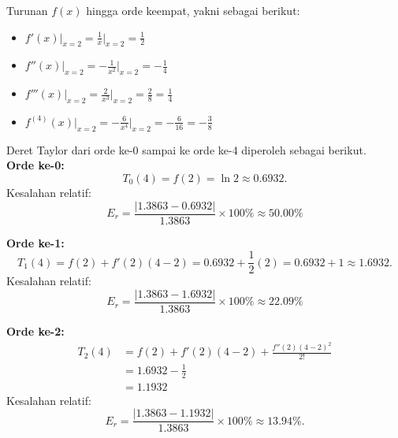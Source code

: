 \documentclass{article}
\begin{document}
\begin{enumerate}
    Turunan $f(x)$ hingga orde keempat, yakni sebagai berikut:
    \begin{itemize}
        \item $f'(x)\big|_{x=2} = \frac{1}{x} \big|_{x=2} = \frac{1}{2}$
        \item $f''(x)\big|_{x=2} = -\frac{1}{x^2} \big|_{x=2} = -\frac{1}{4}$
        \item $f'''(x)\big|_{x=2} = \frac{2}{x^3} \big|_{x=2} = \frac{2}{8} = \frac{1}{4}$
        \item $f^{(4)}(x)\big|_{x=2} = -\frac{6}{x^4} \big|_{x=2} = -\frac{6}{16} = -\frac{3}{8}$
    \end{itemize}
    
    Deret Taylor dari orde ke-0 sampai ke orde ke-4 diperoleh sebagai berikut. \\
    
    \textbf{Orde ke-0:} 
    \begin{equation*}
        T_0(4) = f(2) = \ln{2} \approx \num{0,6932}.
    \end{equation*}
    Kesalahan relatif: 
    \begin{equation*}
        E_r = \frac{\left|\num{1,3863} - \num{0,6932}\right|}{\num{1,3863}} \times 100\% \approx \num{50,00}\%
    \end{equation*}
    
    \textbf{Orde ke-1:} 
    \begin{equation*}
        T_1(4) = f(2) + f'(2)(4-2) = \num{0,6932} + \frac{1}{2}(2) = \num{0,6932} + 1 \approx \num{1,6932}.
    \end{equation*}
    Kesalahan relatif:
    \begin{equation*}
        E_r = \frac{\left|\num{1,3863} - \num{1,6932}\right|}{\num{1,3863}} \times 100\% \approx \num{22,09}\%    
    \end{equation*}
    
    \textbf{Orde ke-2:} 
    \begin{align*}
        T_2(4) 
        &= f(2) + f'(2)(4-2) + \frac{f''(2)(4-2)^2}{2!} \\
        &= \num{1,6932} - \frac{1}{2} \\
        &= \num{1,1932}
    \end{align*}
    Kesalahan relatif:
    \begin{equation*}
        E_r = \frac{\left|\num{1,3863} - \num{1,1932}\right|}{\num{1,3863}} \times 100\% \approx \num{13,94}\%.
    \end{equation*}
    

\end{enumerate}
\end{document}
